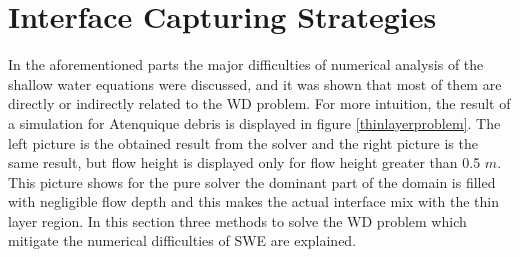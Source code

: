 \documentclass[letterpaper,10pt]{article}
\begin{document}
\section{Interface Capturing Strategies}\label{solution}
In the aforementioned parts the major difficulties of numerical analysis of the shallow water
equations were discussed, and it was shown that most of them are directly or indirectly related to the WD problem.
For more intuition, the result of a simulation for Atenquique debris is displayed in figure \ref{thinlayerproblem}. 
The left picture is the obtained result from the solver and the right picture is the same result, but flow height is displayed 
only for flow height greater than 0.5 $m$. This picture shows for the pure solver the dominant part of the 
domain is filled with negligible flow depth and this makes the actual interface mix with the thin layer region.
In this section three methods to solve the WD problem which mitigate the numerical difficulties of SWE are explained. 
\end{document}
